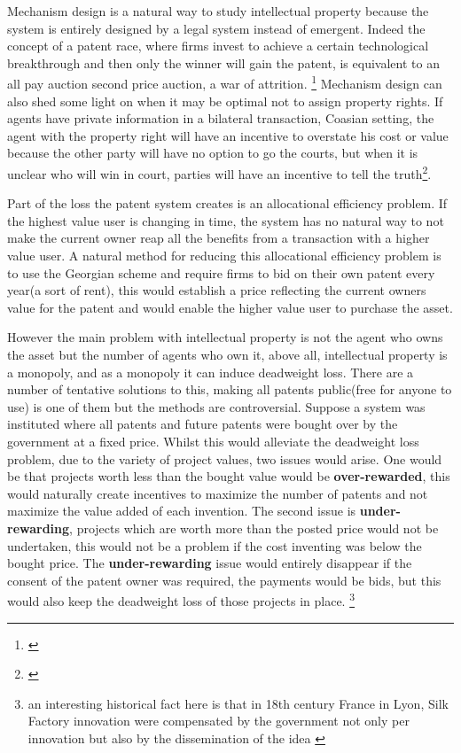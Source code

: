 \documentclass[12pt]{article}
\numberwithin{equation}{section}
\begin{document}
Mechanism design is a natural way to study intellectual property because the system is entirely designed by a legal system instead of emergent. Indeed the concept of a patent race, where firms invest to achieve a certain technological breakthrough and then only the winner will gain the patent, is equivalent to an all pay auction second price auction, a war of attrition. \footnote{ \cite{Games2003} } Mechanism design can also shed some light on when it may be optimal not to assign property rights. If agents have private information in a bilateral transaction, Coasian setting, the agent with the property right will have an incentive to overstate his cost or value because the other party will have no option to go the courts, but when it is unclear who will win in court, parties will have an incentive to tell the truth\footnote{\cite{schmitz2001coase}}.

Part of the loss the patent system creates is an allocational efficiency problem. If the highest value user is changing in time, the system has no natural way to not make the current owner reap all the benefits from a transaction with a higher value user. A natural method for reducing this allocational efficiency problem is to use the Georgian scheme and require firms to bid on their own patent every year(a sort of rent), this would establish a price reflecting the current owners value for the patent and would enable the higher value user to purchase the asset.

However the main problem with intellectual property is not the agent who owns the asset but the number of agents who own it, above all, intellectual property is a monopoly, and as a monopoly it can induce deadweight loss. There are a number of tentative solutions to this, making all patents public(free for anyone to use) is one of them but the methods are controversial. Suppose a system was instituted where all patents and future patents were bought over by the government at a fixed price. Whilst this would alleviate the deadweight loss problem, due to the variety of project values, two issues would arise. One would be that projects worth less than the bought value would be \textbf{over-rewarded}, this would naturally create incentives to maximize the number of patents and not maximize the value added of each invention. The second issue is \textbf{under-rewarding}, projects which are worth more than the posted price would not be undertaken, this would not be a problem if the cost inventing was below the bought price. The \textbf{under-rewarding} issue would entirely disappear if the consent of the patent owner was required, the payments would be bids, but this would also keep the deadweight loss of those projects in place. \footnote{an interesting historical fact here is that in 18th century France in Lyon, Silk Factory innovation were compensated by the government not only per innovation but also by the dissemination of the idea \cite{foray2013patent}}
\end{document}
